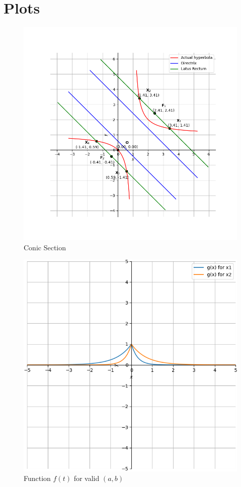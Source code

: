 \documentclass[conference]{IEEEtran}
\theoremstyle{remark}
\begin{document}
	\section{Plots}
	\begin{figure}[H]
		\centering
		\includegraphics[width=1.2\columnwidth]{figs/Hyperbola.png} 
		\caption{Conic Section}
		\label{fig:Hyperbola}
	\end{figure}
	
	\begin{figure}[H]
		\centering
		\includegraphics[width=1\columnwidth]{figs/function.png} 
		\caption{Function $f(t)$ for valid $(a, b)$}
		\label{fig:Function}
	\end{figure}
	
\end{document}
